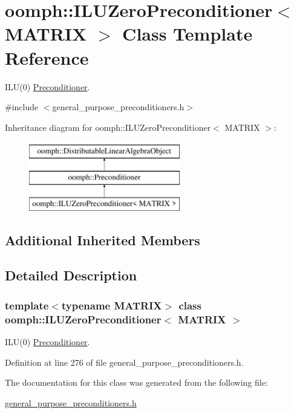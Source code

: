 \hypertarget{classoomph_1_1ILUZeroPreconditioner}{}\section{oomph\+:\+:I\+L\+U\+Zero\+Preconditioner$<$ M\+A\+T\+R\+IX $>$ Class Template Reference}
\label{classoomph_1_1ILUZeroPreconditioner}


I\+L\+U(0) \hyperlink{classoomph_1_1Preconditioner}{Preconditioner}.  




{\ttfamily \#include $<$general\+\_\+purpose\+\_\+preconditioners.\+h$>$}

Inheritance diagram for oomph\+:\+:I\+L\+U\+Zero\+Preconditioner$<$ M\+A\+T\+R\+IX $>$\+:\begin{figure}[H]
\begin{center}
\leavevmode
\includegraphics[height=3.000000cm]{classoomph_1_1ILUZeroPreconditioner}
\end{center}
\end{figure}
\subsection*{Additional Inherited Members}


\subsection{Detailed Description}
\subsubsection*{template$<$typename M\+A\+T\+R\+IX$>$\newline
class oomph\+::\+I\+L\+U\+Zero\+Preconditioner$<$ M\+A\+T\+R\+I\+X $>$}

I\+L\+U(0) \hyperlink{classoomph_1_1Preconditioner}{Preconditioner}. 

Definition at line 276 of file general\+\_\+purpose\+\_\+preconditioners.\+h.



The documentation for this class was generated from the following file\+:\begin{DoxyCompactItemize}
\item 
\hyperlink{general__purpose__preconditioners_8h}{general\+\_\+purpose\+\_\+preconditioners.\+h}\end{DoxyCompactItemize}
